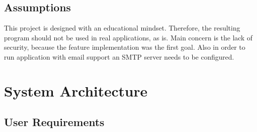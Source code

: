 \documentclass[10pt]{article}
\begin{document}
\subsection{Assumptions} \label{assumptions}
This project is designed with an educational mindset. Therefore, the resulting program
should not be used in real applications, as is. Main concern is the lack of security,
because the feature implementation was the first goal. Also in order to run application
with email support an SMTP server needs to be configured.


\section{System Architecture} \label{system_architecture}


\subsection{User Requirements} \label{user_requirements}
\end{document}
